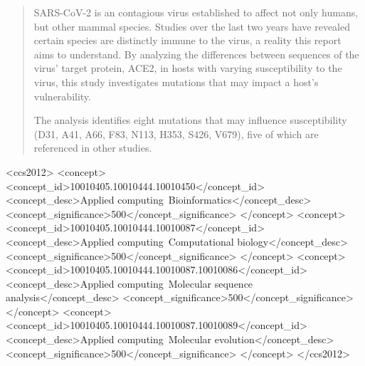 \begin{abstract}
SARS-CoV-2 is an contagious virus established to affect not only humans, but other mammal species. Studies over the last two years have revealed certain species are distinctly immune to the virus, a reality this report aims to understand. By analyzing the differences between sequences of the virus' target protein, ACE2, in hosts with varying susceptibility to the virus, this study investigates mutations that may impact a host's vulnerability.

The analysis identifies eight mutations that may influence susceptibility (D31, A41, A66, F83, N113, H353, S426, V679), five of which are referenced in other studies.
\end{abstract}


\begin{CCSXML}
<ccs2012>
<concept>
<concept_id>10010405.10010444.10010450</concept_id>
<concept_desc>Applied computing~Bioinformatics</concept_desc>
<concept_significance>500</concept_significance>
</concept>
<concept>
<concept_id>10010405.10010444.10010087</concept_id>
<concept_desc>Applied computing~Computational biology</concept_desc>
<concept_significance>500</concept_significance>
</concept>
<concept>
<concept_id>10010405.10010444.10010087.10010086</concept_id>
<concept_desc>Applied computing~Molecular sequence analysis</concept_desc>
<concept_significance>500</concept_significance>
</concept>
<concept>
<concept_id>10010405.10010444.10010087.10010089</concept_id>
<concept_desc>Applied computing~Molecular evolution</concept_desc>
<concept_significance>500</concept_significance>
</concept>
</ccs2012>
\end{CCSXML}


\acmISBN{}
\acmDOI{}


